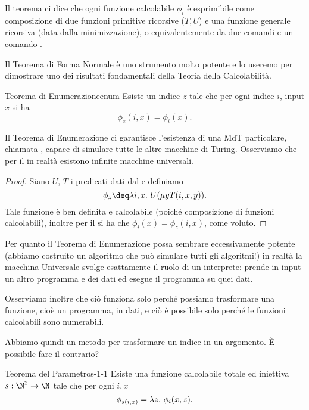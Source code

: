\begin{remark}
    Il teorema ci dice che ogni funzione calcolabile $\phi_i$ è esprimibile come composizione di due funzioni primitive ricorsive ($T, U$) e una funzione generale ricorsiva (data dalla minimizzazione), o equivalentemente da due comandi \FOR{} e un comando \WHILE. 
\end{remark}

Il Teorema di Forma Normale è uno strumento molto potente e lo useremo per dimostrare uno dei risultati fondamentali della Teoria della Calcolabilità.

\begin{theorem}
    {Teorema di Enumerazione}{enum}
    Esiste un indice $z$ tale che per ogni indice $i$, input $x$ si ha \[
        \phi_z(i, x) = \phi_i(x).
    \]  
\end{theorem}

Il Teorema di Enumerazione ci garantisce l'esistenza di una MdT particolare, chiamata , capace di simulare tutte le altre macchine di Turing. Osserviamo che per il  in realtà esistono infinite macchine universali.

\begin{proof}   
    Siano $U$, $T$ i predicati dati dal  e definiamo \[
        \phi_z \deq \lam{i, x}{U(\mu{y}{T(i, x, y)})}.
    \] Tale funzione è ben definita e calcolabile (poiché composizione di funzioni calcolabili), inoltre per il  si ha che $\phi_i(x) = \phi_z(i, x)$, come voluto. 
\end{proof}

Per quanto il Teorema di Enumerazione possa sembrare eccessivamente potente (abbiamo costruito un algoritmo che può simulare tutti gli algoritmi!) in realtà la macchina Universale svolge esattamente il ruolo di un interprete: prende in input un altro programma e dei dati ed esegue il programma su quei dati.

Osserviamo inoltre che ciò funziona solo perché possiamo trasformare una funzione, cioè un programma, in dati, e ciò è possibile solo perché le funzioni calcolabili sono numerabili.

Abbiamo quindi un metodo per trasformare un indice in un argomento. È possibile fare il contrario?

\begin{theorem}
    {Teorema del Parametro}{s-1-1}
    Esiste una funzione calcolabile totale ed iniettiva $s : \N^2 \to \N$ tale che per ogni $i, x$ \[
        \phi_{s(i, x)} = \lambda{z}.\ {\phi_i(x, z)}.
    \] 
\end{theorem}

